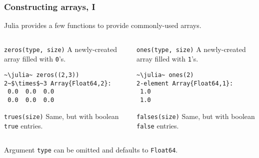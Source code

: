 \documentclass[english,serif,mathserif,xcolor=pdftex,dvipsnames,table]{beamer}
\begin{document}
\begin{frame}[fragile]
  \frametitle{Constructing arrays, I}
    \small
  Julia provides a few functions to provide commonly-used arrays.
  \begin{columns}
    \begin{column}{0.5\textwidth}
      \raggedright

      \begin{describe}{\texttt{zeros(type, size)}}
        A newly-created array filled with \texttt{0}'s.
\begin{lstlisting}
~\julia~ zeros((2,3))
2~$\times$~3 Array{Float64,2}:
 0.0  0.0  0.0
 0.0  0.0  0.0
\end{lstlisting}
      \end{describe}

      \begin{describe}{\texttt{trues(size)}}
        Same, but with boolean \texttt{true} entries.
      \end{describe}
    \end{column}
    \begin{column}{0.5\textwidth}
      \raggedright

      \begin{describe}{\texttt{ones(type, size)}}
        A newly-created array filled with \texttt{1}'s.
\begin{lstlisting}
~\julia~ ones(2)
2-element Array{Float64,1}:
 1.0
 1.0
\end{lstlisting}
      \end{describe}

      \begin{describe}{\texttt{falses(size)}}
        Same, but with boolean \texttt{false} entries.
      \end{describe}
    \end{column}
  \end{columns}

  \+
  Argument \texttt{type} can be omitted and defaults to \texttt{Float64}.
\end{frame}
\end{document}
